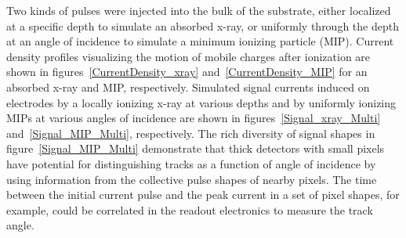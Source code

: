 Two kinds of pulses were injected into the bulk of the substrate, either localized at a specific depth to simulate an absorbed x-ray, or uniformly through the depth at an angle of incidence to simulate a minimum ionizing particle (MIP).
Current density profiles visualizing the motion of mobile charges after ionization are shown in figures~\ref{CurrentDensity_xray} and~\ref{CurrentDensity_MIP} for an absorbed x-ray and MIP, respectively.
Simulated signal currents induced on electrodes by a locally ionizing x-ray at various depths and by uniformly ionizing MIPs at various angles of incidence are shown in figures~\ref{Signal_xray_Multi} and~\ref{Signal_MIP_Multi}, respectively.
The rich diversity of signal shapes in figure~\ref{Signal_MIP_Multi} demonstrate that thick detectors with small pixels have potential for distinguishing tracks as a function of angle of incidence by using information from the collective pulse shapes of nearby pixels. 
The time between the initial current pulse and the peak current in a set of pixel shapes, for example, could be correlated in the readout electronics to measure the track angle.

